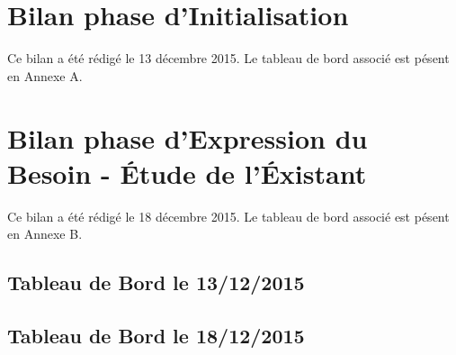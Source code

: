 

\newcommand{\mainTitle}{\'Etude préalable - SPIE}
\newcommand{\secondTitle}{Document de suivi}
\newcommand{\documentRef}{TB/4401/1}




\newpage

\tableofcontents
\listoffigures
\listoftables
\newpage


\part{Bilan phase d'Initialisation}

Ce bilan a été rédigé le 13 décembre 2015. Le tableau de bord associé est pésent en Annexe A.

\setcounter{section}{0}


\part{Bilan phase d'Expression du Besoin - \'Etude de l'\'Existant}

Ce bilan a été rédigé le 18 décembre 2015. Le tableau de bord associé est pésent en Annexe B.

\setcounter{section}{0}



\begin{appendices}

\chapter{Tableau de Bord le 13/12/2015}


\chapter{Tableau de Bord le 18/12/2015}


\end{appendices}


